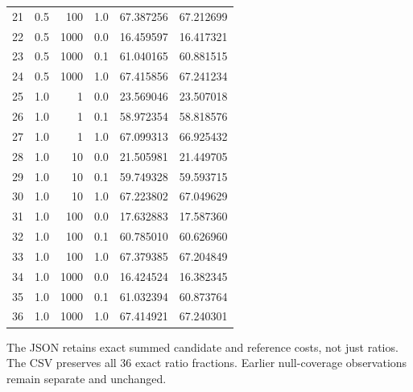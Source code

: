 \documentclass[10pt]{article}
\begin{document}
\begin{longtable}{rrrrrr}
21 & 0.5 & 100 & 1.0 & 67.387256 & 67.212699 \\
22 & 0.5 & 1000 & 0.0 & 16.459597 & 16.417321 \\
23 & 0.5 & 1000 & 0.1 & 61.040165 & 60.881515 \\
24 & 0.5 & 1000 & 1.0 & 67.415856 & 67.241234 \\
25 & 1.0 & 1 & 0.0 & 23.569046 & 23.507018 \\
26 & 1.0 & 1 & 0.1 & 58.972354 & 58.818576 \\
27 & 1.0 & 1 & 1.0 & 67.099313 & 66.925432 \\
28 & 1.0 & 10 & 0.0 & 21.505981 & 21.449705 \\
29 & 1.0 & 10 & 0.1 & 59.749328 & 59.593715 \\
30 & 1.0 & 10 & 1.0 & 67.223802 & 67.049629 \\
31 & 1.0 & 100 & 0.0 & 17.632883 & 17.587360 \\
32 & 1.0 & 100 & 0.1 & 60.785010 & 60.626960 \\
33 & 1.0 & 100 & 1.0 & 67.379385 & 67.204849 \\
34 & 1.0 & 1000 & 0.0 & 16.424524 & 16.382345 \\
35 & 1.0 & 1000 & 0.1 & 61.032394 & 60.873764 \\
36 & 1.0 & 1000 & 1.0 & 67.414921 & 67.240301 \\
\bottomrule\end{longtable}
\noindent The JSON retains exact summed candidate and reference costs, not just ratios. The CSV preserves all 36 exact ratio fractions. Earlier null-coverage observations remain separate and unchanged.
\end{document}
